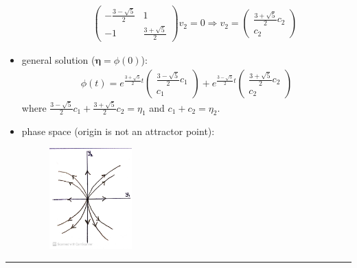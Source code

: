 \documentclass[12pt, letterpaper]{scrartcl}
\begin{document}
\begin{itemize}
\begin{itemize}
\begin{align*}
            \left(\begin{array}{cc}
            -\frac{3-\sqrt{5}}{2} & 1 \\
            -1 & \frac{3+\sqrt{5}}{2} 
            \end{array}\right)
            v_2=0
            \Longrightarrow
            v_2=\left(\begin{array}{c}
            \frac{3+\sqrt{5}}{2} c_2 \\
            c_2
            \end{array}\right)
        \end{align*}
    \end{itemize}
    \item general solution (${\boldsymbol\eta}=\phi(0)$):
    \begin{align*}
        \phi(t)=
        e^{\frac{3+\sqrt{5}}{2}t}
        \left(\begin{array}{c}
            \frac{3-\sqrt{5}}{2}c_1 \\
             c_1 
        \end{array}\right)
        +
        e^{\frac{3-\sqrt{5}}{2}t}
        \left(\begin{array}{c}
            \frac{3+\sqrt{5}}{2} c_2 \\
            c_2
        \end{array}\right)
    \end{align*}
    where $\frac{3-\sqrt{5}}{2}c_1+\frac{3+\sqrt{5}}{2} c_2=\eta_1$ and $c_1+c_2=\eta_2$.
    
    \item phase space (origin is not an attractor point):
    
    \begin{figure}[H]
    \centering
    \includegraphics[width=0.3\textwidth]{fig/2.8.12.JPG}
    \end{figure}
\end{itemize}
\vskip1mm\hrule
\end{document}

